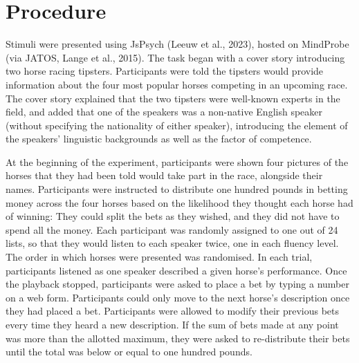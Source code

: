 \documentclass[
  man,floatsintext]{apa7}
\begin{document}
\hypertarget{procedure}{%
\section{Procedure}\label{procedure}}

Stimuli were presented using JsPsych (Leeuw et al., 2023), hosted on MindProbe (via JATOS, Lange et al., 2015). The task began with a cover story introducing two horse racing tipsters. Participants were told the tipsters would provide information about the four most popular horses competing in an upcoming race. The cover story explained that the two tipsters were well-known experts in the field, and added that one of the speakers was a non-native English speaker (without specifying the nationality of either speaker), introducing the element of the speakers' linguistic backgrounds as well as the factor of competence.

At the beginning of the experiment, participants were shown four pictures of the horses that they had been told would take part in the race, alongside their names. Participants were instructed to distribute one hundred pounds in betting money across the four horses based on the likelihood they thought each horse had of winning: They could split the bets as they wished, and they did not have to spend all the money. Each participant was randomly assigned to one out of 24 lists, so that they would listen to each speaker twice, one in each fluency level. The order in which horses were presented was randomised. In each trial, participants listened as one speaker described a given horse's performance. Once the playback stopped, participants were asked to place a bet by typing a number on a web form. Participants could only move to the next horse's description once they had placed a bet. Participants were allowed to modify their previous bets every time they heard a new description. If the sum of bets made at any point was more than the allotted maximum, they were asked to re-distribute their bets until the total was below or equal to one hundred pounds.
\end{document}
